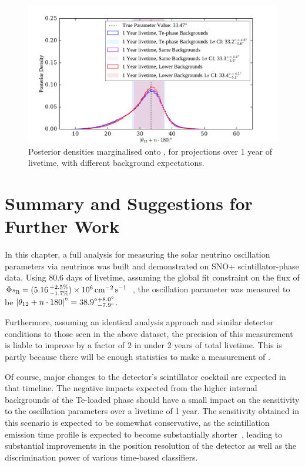 \begin{figure}[!th]
    \centering
    \includegraphics[width=\textwidth]{6_SolarAnalysis/images/theta_12_comparison_projections_low_vs_Te_backs_1yr.pdf}
    \caption{Posterior densities marginalised onto \tonetwo{}, for projections over 1 year of livetime, with different background expectations.}
    \label{fig:1D_posteriors_low_vs_hi_backs}
\end{figure}

\section{Summary and Suggestions for Further Work}\label{sec:solar_summary}
In this chapter, a full analysis for measuring the solar neutrino oscillation parameters via \beight{} neutrinos was built and demonstrated on SNO+ scintillator-phase data. Using 80.6 days of livetime, assuming the global fit constraint on the \beight{} flux of $\Phi_{\beight{}} = (5.16\,^{+2.5\%}_{-1.7\%})\times 10^{6}\,\si{\per\cm\squared\per\second}$~\cite{bergstromUpdatedDeterminationSolar2016}, %
the oscillation parameter \tonetwo{} was measured to be $\left|\theta_{12}{} + n\cdot180\right|^{\circ} = 38.9^{\circ+8.0^{\circ}}_{\phantom{\circ}-7.9^{\circ}}$.

Furthermore, assuming an identical analysis approach and similar detector conditions to those seen in the above dataset, the precision of this measurement is liable to improve by a factor of 2 in under 2 years of total livetime. This is partly because there will be enough statistics to make a measurement of \dmsq{}.

Of course, major changes to the detector's scintillator cocktail are expected in that timeline. The negative impacts expected from the higher internal backgrounds of the Te-loaded phase should have a small impact on the sensitivity to the oscillation parameters over a livetime of 1 year. The sensitivity obtained in this scenario is expected to be somewhat conservative, as the scintillation emission time profile is expected to become substantially shorter~\cite{autyMethodLoadTellurium2023}, %
leading to substantial improvements in the position resolution of the detector as well as the discrimination power of various time-based classifiers.

